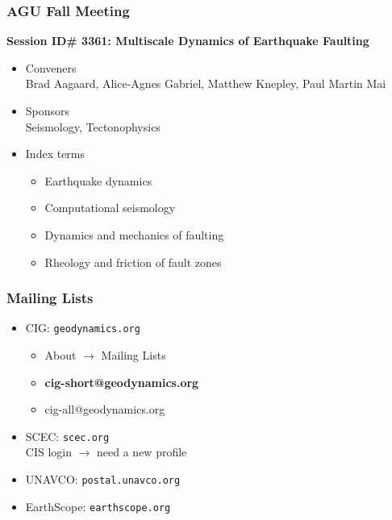\documentclass{beamer}
\newcommand{\important}[1]{{\bf\color{red}#1}}
\begin{document}
\begin{frame}
  \frametitle{AGU Fall Meeting}
  \summary{}

\important{Session ID\# 3361: Multiscale Dynamics of Earthquake Faulting}
  \begin{itemize}
  \item Conveners\\
    Brad Aagaard, Alice-Agnes Gabriel, Matthew Knepley, Paul Martin
    Mai
  \item Sponsors\\
    Seismology, Tectonophysics
  \item Index terms
    \begin{itemize}
    \item Earthquake dynamics
    \item Computational seismology
    \item Dynamics and mechanics of faulting
    \item Rheology and friction of fault zones
    \end{itemize}
  \end{itemize}

\end{frame}


\begin{frame}
  \frametitle{Mailing Lists}

  \begin{itemize}
  \item CIG: {\tt geodynamics.org}
    \begin{itemize}
    \item About $\rightarrow$ Mailing Lists
    \item \important{cig-short@geodynamics.org}
    \item cig-all@geodynamics.org
    \end{itemize}
  \item SCEC: {\tt scec.org}\\
    CIS login $\rightarrow$ need a new profile
  \item UNAVCO: {\tt postal.unavco.org}
  \item EarthScope: {\tt earthscope.org}
  \end{itemize}

\end{frame}


\end{document}
